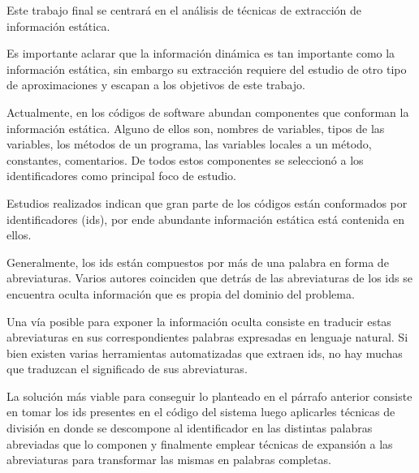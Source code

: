 \documentclass[a4paper,12pt]{report}
\begin{document}
Este trabajo final se centrará en el análisis de técnicas de extracción de información estática.

Es importante aclarar que la información dinámica es tan importante como la información estática, sin embargo su extracción requiere del estudio de otro tipo de aproximaciones y escapan a los objetivos de este trabajo.

Actualmente, en los códigos de software abundan componentes que conforman la información estática. Alguno de ellos son, nombres de variables, tipos de las variables, los métodos de un programa, las variables locales a un método, constantes, comentarios. De todos estos componentes se seleccionó a los identificadores como principal foco de estudio. 


Estudios realizados\cite{DFPM05} indican que gran parte de los códigos están conformados por identificadores (ids), por ende abundante información estática está contenida en ellos.

Generalmente, los ids están compuestos por más de una palabra en forma de abreviaturas. Varios autores coinciden\cite{BCPT99,LFBEX07,EZH08,EHPV09,DLHD06,DCHD06} que detrás de las abreviaturas de los ids se encuentra oculta información que es propia del dominio del problema.

Una vía posible para exponer la información oculta consiste en traducir estas abreviaturas en sus correspondientes palabras expresadas en lenguaje natural. Si bien existen varias herramientas automatizadas que extraen ids, no hay muchas que traduzcan el significado de sus abreviaturas.



La solución más viable para conseguir lo planteado en el párrafo anterior consiste en tomar los ids presentes en el código del sistema luego aplicarles técnicas de división en donde se descompone al identificador en las distintas palabras abreviadas que lo componen
y finalmente emplear técnicas de expansión a las abreviaturas para transformar las mismas en palabras completas.
\end{document}
